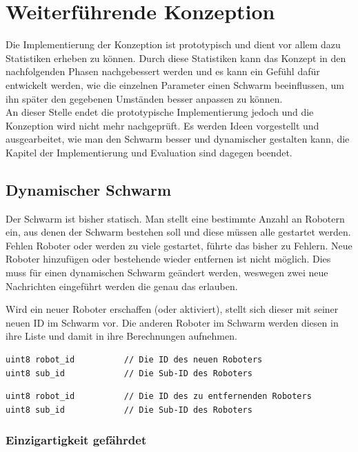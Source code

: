 \section{Weiterführende Konzeption}

Die Implementierung der Konzeption ist prototypisch und dient vor allem dazu Statistiken erheben zu können. Durch diese Statistiken kann das Konzept in den nachfolgenden Phasen nachgebessert werden und es kann ein Gefühl dafür entwickelt werden, wie die einzelnen Parameter einen Schwarm beeinflussen, um ihn später den gegebenen Umständen besser anpassen zu können.\\

An dieser Stelle endet die prototypische Implementierung jedoch und die Konzeption wird nicht mehr nachgeprüft. Es werden Ideen vorgestellt und ausgearbeitet, wie man den Schwarm besser und dynamischer gestalten kann, die Kapitel der Implementierung und Evaluation sind dagegen beendet.

\subsection{Dynamischer Schwarm}

Der Schwarm ist bisher statisch. Man stellt eine bestimmte Anzahl an Robotern ein, aus denen der Schwarm bestehen soll und diese müssen alle gestartet werden. Fehlen Roboter oder werden zu viele gestartet, führte das bisher zu Fehlern. Neue Roboter hinzufügen oder bestehende wieder entfernen ist nicht möglich. Dies muss für einen dynamischen Schwarm geändert werden, weswegen zwei neue Nachrichten eingeführt werden die genau das erlauben.

Wird ein neuer Roboter erschaffen (oder aktiviert), stellt sich dieser mit seiner neuen ID im Schwarm vor. Die anderen Roboter im Schwarm werden diesen in ihre Liste und damit in ihre Berechnungen aufnehmen.

\begin{lstlisting}[style=ros, title=Nachrichten-Typ: New\_Robot.msg]
uint8 robot_id			// Die ID des neuen Roboters
uint8 sub_id			// Die Sub-ID des Roboters
\end{lstlisting}

\begin{lstlisting}[style=ros, title=Nachrichten-Typ: Delete\_Robot.msg]
uint8 robot_id			// Die ID des zu entfernenden Roboters
uint8 sub_id			// Die Sub-ID des Roboters
\end{lstlisting}

\subsubsection*{Einzigartigkeit gefährdet}

